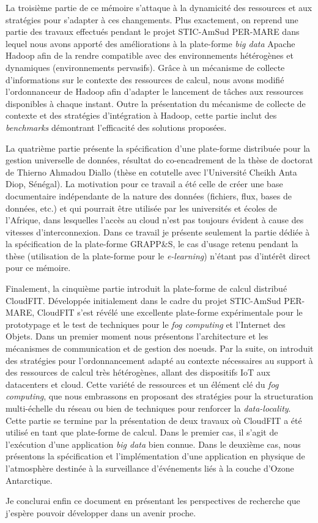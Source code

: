 La troisième partie de ce mémoire s'attaque à la dynamicité des ressources et aux stratégies pour s'adapter à ces changements. Plus exactement, on reprend une partie des travaux effectués pendant le projet STIC-AmSud PER-MARE dans lequel nous avons apporté des améliorations à la plate-forme \textit{big data} Apache Hadoop afin de la rendre compatible avec des environnements hétérogènes et dynamiques (environnements pervasifs). Grâce à un mécanisme de collecte d'informations sur le contexte des ressources de calcul, nous avons modifié l'ordonnanceur de Hadoop afin d'adapter le lancement de tâches aux ressources disponibles à chaque instant. Outre la présentation du mécanisme de collecte de contexte et des stratégies d'intégration à Hadoop, cette partie inclut des \textit{benchmarks} démontrant l'efficacité des solutions proposées. 

La quatrième partie présente la spécification d'une plate-forme distribuée pour la gestion universelle de données, résultat do co-encadrement de la thèse de doctorat de Thierno Ahmadou Diallo (thèse en cotutelle avec l'Université Cheikh Anta Diop, Sénégal). La motivation pour ce travail a été celle de créer une base documentaire indépendante de la nature des données (fichiers, flux, bases de données, etc.) et qui pourrait être utilisée par les universités et écoles de l'Afrique, dans lesquelles l'accès au cloud n'est pas toujours évident à cause des vitesses d'interconnexion. Dans ce travail je présente seulement la partie dédiée à la spécification de la plate-forme GRAPP\&S, le cas d'usage retenu pendant la thèse (utilisation de la plate-forme pour le \textit{e-learning}) n'étant pas d'intérêt direct pour ce mémoire. 

Finalement, la cinquième partie introduit la plate-forme de calcul distribué CloudFIT. Développée initialement dans le cadre du projet STIC-AmSud PER-MARE, CloudFIT s'est révélé une excellente plate-forme expérimentale pour le prototypage et le test de techniques pour le \textit{fog computing} et l'Internet des Objets. Dans un premier moment nous présentons l'architecture et les mécanismes de communication et de gestion des n{oe}uds. Par la suite, on introduit des stratégies pour l'ordonnancement adapté au contexte nécessaires au support à des ressources de calcul très hétérogènes, allant des dispositifs IoT aux datacenters et cloud. Cette variété de ressources et un élément clé du \textit{fog computing}, que nous embrassons en proposant des stratégies pour la structuration multi-échelle du réseau ou bien de techniques pour renforcer la \textit{data-locality}. Cette partie se termine par la présentation de deux travaux où CloudFIT a été utilisé en tant que plate-forme de calcul. Dans le premier cas, il s'agit de l'exécution d'une application \textit{big data} bien connue. Dans le deuxième cas, nous présentons la spécification et l'implémentation d'une application en physique de l'atmosphère destinée à la surveillance d'événements liés à la couche d'Ozone Antarctique. 

Je conclurai enfin ce document en présentant les perspectives de recherche que j'espère pouvoir développer dans un avenir proche.


 

